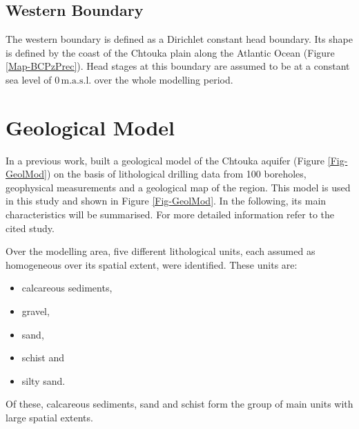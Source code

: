 \subsection{Western Boundary}

The western boundary is defined as a Dirichlet constant head boundary. 
Its shape is defined by the coast of the Chtouka plain along the Atlantic Ocean (Figure \ref{Map-BCPzPrec}). 
Head stages at this boundary are assumed to be at a constant sea level of $0 \, \textrm{m.a.s.l.}$ over the whole modelling period.


\section{Geological Model}
\label{Sec-GeolModel}

In a previous work, \textcite{Horn.2021} built a geological model of the Chtouka aquifer (Figure \ref{Fig-GeolMod}) on the basis of lithological drilling data from 100 boreholes, geophysical measurements and a geological map of the region. 
This model is used in this study and shown in Figure \ref{Fig-GeolMod}. 
In the following, its main characteristics will be summarised. 
For more detailed information refer to the cited study.

Over the modelling area, five different lithological units, each assumed as homogeneous over its spatial extent, were identified. 
These units are:

\begin{itemize}
    \item calcareous sediments,
    \item gravel,
    \item sand,
    \item schist and
    \item silty sand.
\end{itemize}

Of these, calcareous sediments, sand and schist form the group of main units with large spatial extents. 

